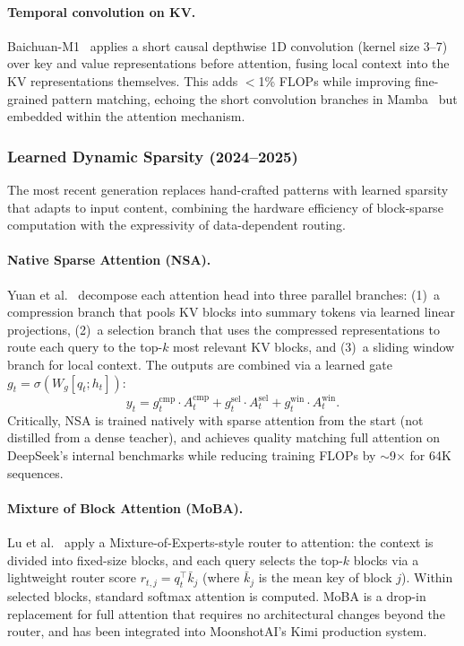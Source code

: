 \paragraph{Temporal convolution on KV.}
Baichuan-M1~\cite{baichuan2025m1} applies a short causal depthwise 1D convolution (kernel size 3--7) over key and value representations before attention, fusing local context into the KV representations themselves. This adds $<$1\% FLOPs while improving fine-grained pattern matching, echoing the short convolution branches in Mamba~\cite{gu2024mamba} but embedded within the attention mechanism.

\subsubsection{Learned Dynamic Sparsity (2024--2025)}

The most recent generation replaces hand-crafted patterns with learned sparsity that adapts to input content, combining the hardware efficiency of block-sparse computation with the expressivity of data-dependent routing.

\paragraph{Native Sparse Attention (NSA).}
Yuan et al.~\cite{yuan2025native} decompose each attention head into three parallel branches: (1)~a compression branch that pools KV blocks into summary tokens via learned linear projections, (2)~a selection branch that uses the compressed representations to route each query to the top-$k$ most relevant KV blocks, and (3)~a sliding window branch for local context. The outputs are combined via a learned gate $g_t = \sigma(W_g [q_t; h_t])$:
\begin{equation}
y_t = g_t^{\text{cmp}} \cdot A_t^{\text{cmp}} + g_t^{\text{sel}} \cdot A_t^{\text{sel}} + g_t^{\text{win}} \cdot A_t^{\text{win}}.
\label{eq:nsa}
\end{equation}
Critically, NSA is trained natively with sparse attention from the start (not distilled from a dense teacher), and achieves quality matching full attention on DeepSeek's internal benchmarks while reducing training FLOPs by $\sim$9$\times$ for 64K sequences.

\paragraph{Mixture of Block Attention (MoBA).}
Lu et al.~\cite{lu2025moba} apply a Mixture-of-Experts-style router to attention: the context is divided into fixed-size blocks, and each query selects the top-$k$ blocks via a lightweight router score $r_{t,j} = q_t^\top \bar{k}_j$ (where $\bar{k}_j$ is the mean key of block $j$). Within selected blocks, standard softmax attention is computed. MoBA is a drop-in replacement for full attention that requires no architectural changes beyond the router, and has been integrated into MoonshotAI's Kimi production system.

